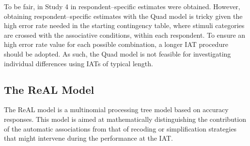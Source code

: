 \documentclass[12pt]{book}
\begin{document}
To be fair, in Study 4 in  respondent--specific estimates were obtained. 
However, obtaining respondent--specific estimates with the Quad model is tricky given the high error rate needed in the starting contingency table, where stimuli categories are crossed with the associative conditions, within each respondent. To ensure an high error rate value for each possible combination, a longer IAT procedure should be adopted. As such, the Quad model is not feasible for investigating individual differences using IATs of typical length.






\subsection{The ReAL Model}\label{sub:real}

The ReAL model \cite{Meissner2013} is a multinomial processing tree model based on accuracy responses. 
This model is aimed at mathematically distinguishing the contribution of the automatic associations from that of recoding or simplification strategies that might intervene during the performance at the IAT. 
\end{document}
